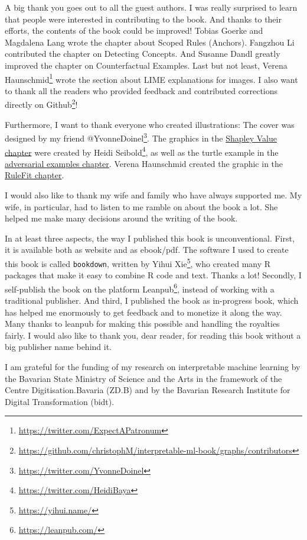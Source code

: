 \documentclass[
  11pt,
]{scrbook}
\renewcommand{\href}[2]{#2\footnote{\url{#1}}}
\begin{document}
A big thank you goes out to all the guest authors.
I was really surprised to learn that people were interested in contributing to the book.
And thanks to their efforts, the contents of the book could be improved!
Tobias Goerke and Magdalena Lang wrote the chapter about Scoped Rules (Anchors).
Fangzhou Li contributed the chapter on Detecting Concepts.
And Susanne Dandl greatly improved the chapter on Counterfactual Examples.
Last but not least, \href{https://twitter.com/ExpectAPatronum}{Verena Haunschmid} wrote the section about LIME explanations for images.
I also want to thank all the readers who provided feedback and contributed corrections directly \href{https://github.com/christophM/interpretable-ml-book/graphs/contributors}{on Github}!

Furthermore, I want to thank everyone who created illustrations:
The cover was designed by my friend \href{https://twitter.com/YvonneDoinel}{@YvonneDoinel}.
The graphics in the \protect\hyperlink{shapley}{Shapley Value chapter} were created by \href{https://twitter.com/HeidiBaya}{Heidi Seibold}, as well as the turtle example in the \protect\hyperlink{adversarial}{adversarial examples chapter}.
Verena Haunschmid created the graphic in the \protect\hyperlink{rulefit}{RuleFit chapter}.

I would also like to thank my wife and family who have always supported me.
My wife, in particular, had to listen to me ramble on about the book a lot.
She helped me make many decisions around the writing of the book.

In at least three aspects, the way I published this book is unconventional.
First, it is available both as website and as ebook/pdf.
The software I used to create this book is called \texttt{bookdown}, written by \href{https://yihui.name/}{Yihui Xie}, who created many R packages that make it easy to combine R code and text.
Thanks a lot!
Secondly, I self-publish the book on the platform \href{https://leanpub.com/}{Leanpub}, instead of working with a traditional publisher.
And third, I published the book as in-progress book, which has helped me enormously to get feedback and to monetize it along the way.
Many thanks to leanpub for making this possible and handling the royalties fairly.
I would also like to thank you, dear reader, for reading this book without a big publisher name behind it.

I am grateful for the funding of my research on interpretable machine learning by the Bavarian State Ministry of Science and the Arts in the framework of the Centre Digitisation.Bavaria (ZD.B) and by the Bavarian Research Institute for Digital Transformation (bidt).
\end{document}
